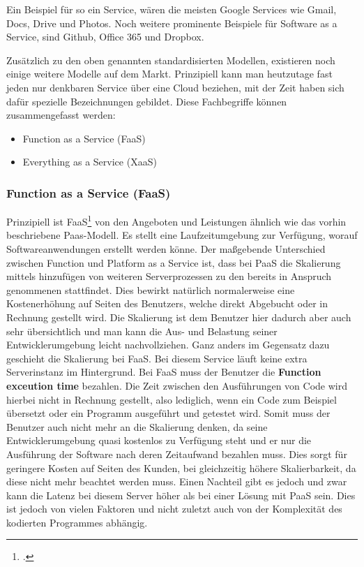 Ein Beispiel für so ein Service, wären die meisten Google Services wie Gmail, Docs, Drive und Photos. Noch weitere prominente Beispiele für Software as a Service, sind Github, Office 365 und Dropbox.

Zusätzlich zu den oben genannten standardisierten Modellen, existieren noch einige weitere Modelle auf dem Markt. Prinzipiell
kann man heutzutage fast jeden nur denkbaren Service über eine Cloud beziehen, mit der Zeit haben sich dafür spezielle Bezeichnungen gebildet. Diese Fachbegriffe können zusammengefasst werden:
\begin{itemize}
	\item Function as a Service (FaaS)
	\item Everything as a Service (XaaS)
\end{itemize}


\subsubsection{Function as a Service (FaaS)}
Prinzipiell ist FaaS\footcite{cloud-ms} von den Angeboten und Leistungen ähnlich wie das vorhin beschriebene Paas-Modell. Es stellt eine Laufzeitumgebung zur Verfügung, worauf Softwareanwendungen erstellt werden könne. Der maßgebende Unterschied zwischen Function und Platform as a Service ist, dass bei PaaS die Skalierung mittels hinzufügen von weiteren Serverprozessen zu den bereits in Anspruch genommenen stattfindet. Dies bewirkt natürlich normalerweise eine Kostenerhöhung auf Seiten des Benutzers, welche direkt Abgebucht oder in Rechnung gestellt wird. Die Skalierung ist dem Benutzer hier dadurch aber auch sehr übersichtlich und man kann die Aus- und Belastung seiner Entwicklerumgebung leicht nachvollziehen.\newline
Ganz anders im Gegensatz dazu geschieht die Skalierung bei FaaS. Bei diesem Service läuft keine extra Serverinstanz im Hintergrund. Bei FaaS muss der Benutzer die \textbf{Function exceution time} bezahlen. Die Zeit zwischen den Ausführungen von Code wird hierbei nicht in Rechnung gestellt, also lediglich, wenn ein Code zum Beispiel übersetzt oder ein Programm ausgeführt und getestet wird. Somit muss der Benutzer auch nicht mehr an die Skalierung denken, da seine Entwicklerumgebung quasi kostenlos zu Verfügung steht und er nur die Ausführung der Software nach deren Zeitaufwand bezahlen muss. Dies sorgt für geringere Kosten auf Seiten des Kunden, bei gleichzeitig höhere Skalierbarkeit, da diese nicht mehr beachtet werden muss. Einen Nachteil gibt es jedoch und zwar kann die Latenz bei diesem Server höher als bei einer Lösung mit PaaS sein. Dies ist jedoch von vielen Faktoren und nicht zuletzt auch von der Komplexität des kodierten Programmes abhängig.


